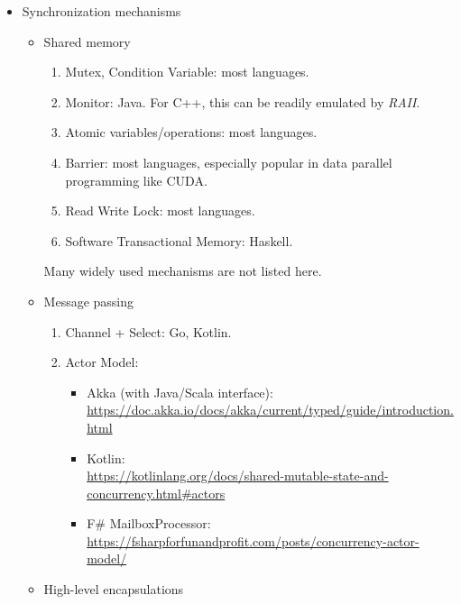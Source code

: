 \documentclass{article}
\begin{document}
\begin{itemize}
\begin{itemize}
        \item Synchronization mechanisms
        \begin{itemize}
            \item Shared memory
            \begin{enumerate}
                \item Mutex, Condition Variable: most languages.
                \item Monitor: Java.
                For C++, this can be readily emulated by \emph{RAII}.
                \item Atomic variables/operations: most languages.
                \item Barrier: most languages, especially popular in data parallel programming like CUDA.
                \item Read Write Lock: most languages.
                \item Software Transactional Memory: Haskell.
            \end{enumerate}
            Many widely used mechanisms are not listed here.
            \item Message passing
            \begin{enumerate}
                \item Channel + Select: Go, Kotlin.
                \item Actor Model:
                    \begin{itemize}
                        \item Akka (with Java/Scala interface):\\ \href{https://doc.akka.io/docs/akka/current/typed/guide/introduction.html}{https://doc.akka.io/docs/akka/current/typed/guide/introduction.html}
                        \item Kotlin:\\
                        \href{https://kotlinlang.org/docs/shared-mutable-state-and-concurrency.html#actors}{https://kotlinlang.org/docs/shared-mutable-state-and-concurrency.html\#actors}
                        \item F\# MailboxProcessor:\\
                        \href{https://fsharpforfunandprofit.com/posts/concurrency-actor-model/}{https://fsharpforfunandprofit.com/posts/concurrency-actor-model/}
                    \end{itemize}
            \end{enumerate}
            \item High-level encapsulations

\end{itemize}
\end{itemize}
\end{itemize}
\end{document}
